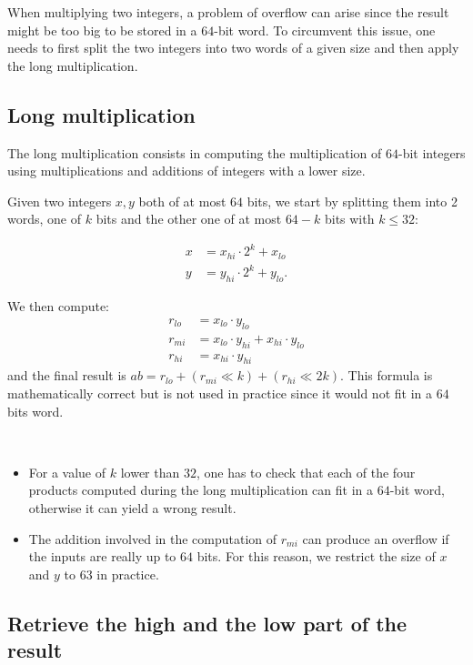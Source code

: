 \documentclass[a4paper]{article}
\begin{document}
When multiplying two integers, a problem of overflow can arise since the result might be too big to be stored in a $64$-bit word. 
To circumvent this issue, one needs to first split the two integers into two words of a given size and then apply the long multiplication.

\subsection{Long multiplication} \label{mulsplit}

The long multiplication consists in computing the multiplication of $64$-bit integers using multiplications and additions of
integers with a lower size.

\bigskip
Given two integers $x,y$ both of at most $64$ bits, we start by splitting them into 2 words, one of $k$ bits and the other one of at most $64-k$
bits with $k\leq32$:

\begin{align*}
    x &= x_{hi}\cdot 2^{k} + x_{lo} \\
    y &= y_{hi}\cdot 2^{k} + y_{lo}.
\end{align*}

\bigskip
We then compute:
\begin{align*}
    r_{lo} &= x_{lo}\cdot y_{lo} \\
    r_{mi} &= x_{lo}\cdot y_{hi} + x_{hi}\cdot y_{lo} \\
    r_{hi} &= x_{hi}\cdot y_{hi}
\end{align*}
and the final result is $ab = r_{lo} + (r_{mi} \ll k) + (r_{hi} \ll 2k)$. 
This formula is mathematically correct but is not used in practice since it would not fit in a $64$ bits word. 

\begin{remark}
    \
    \begin{itemize}
        \item For a value of $k$ lower than $32$, one has to check that each of the four products computed during the long multiplication can fit in a
        $64$-bit word, otherwise it can yield a wrong result.
        \item The addition involved in the computation of $r_{mi}$ can produce an overflow if the inputs are really up to $64$ bits.
        For this reason, we restrict the size of $x$ and $y$ to $63$ in practice. 
    \end{itemize}
\end{remark}

\subsection{Retrieve the high and the low part of the result}
\end{document}
